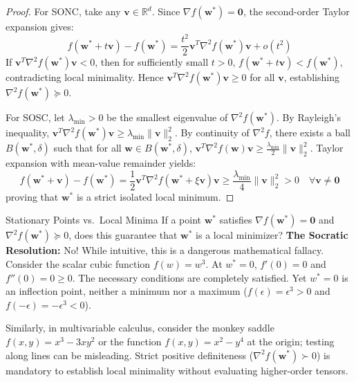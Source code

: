\begin{proof}
For SONC, take any $\mathbf{v} \in \mathbb{R}^d$. Since $\nabla f(\mathbf{w}^*) = \mathbf{0}$, the second-order Taylor expansion gives:
\begin{equation}
f(\mathbf{w}^* + t\mathbf{v}) - f(\mathbf{w}^*) = \frac{t^2}{2} \mathbf{v}^T \nabla^2 f(\mathbf{w}^*) \mathbf{v} + o(t^2)
\end{equation}
If $\mathbf{v}^T \nabla^2 f(\mathbf{w}^*) \mathbf{v} < 0$, then for sufficiently small $t > 0$, $f(\mathbf{w}^* + t\mathbf{v}) < f(\mathbf{w}^*)$, contradicting local minimality. Hence $\mathbf{v}^T \nabla^2 f(\mathbf{w}^*) \mathbf{v} \ge 0$ for all $\mathbf{v}$, establishing $\nabla^2 f(\mathbf{w}^*) \succeq 0$.

For SOSC, let $\lambda_{\min} > 0$ be the smallest eigenvalue of $\nabla^2 f(\mathbf{w}^*)$. By Rayleigh's inequality, $\mathbf{v}^T \nabla^2 f(\mathbf{w}^*) \mathbf{v} \ge \lambda_{\min} \|\mathbf{v}\|_2^2$. By continuity of $\nabla^2 f$, there exists a ball $B(\mathbf{w}^*, \delta)$ such that for all $\mathbf{w} \in B(\mathbf{w}^*, \delta)$, $\mathbf{v}^T \nabla^2 f(\mathbf{w}) \mathbf{v} \ge \frac{\lambda_{\min}}{2} \|\mathbf{v}\|_2^2$. Taylor expansion with mean-value remainder yields:
\begin{equation}
f(\mathbf{w}^* + \mathbf{v}) - f(\mathbf{w}^*) = \frac{1}{2}\mathbf{v}^T \nabla^2 f(\mathbf{w}^* + \xi \mathbf{v}) \mathbf{v} \ge \frac{\lambda_{\min}}{4} \|\mathbf{v}\|_2^2 > 0 \quad \forall \mathbf{v} \ne \mathbf{0}
\end{equation}
proving that $\mathbf{w}^*$ is a strict isolated local minimum.
\end{proof}

\begin{ponderbox}{Stationary Points vs.\ Local Minima}
If a point $\mathbf{w}^*$ satisfies $\nabla f(\mathbf{w}^*) = \mathbf{0}$ and $\nabla^2 f(\mathbf{w}^*) \succeq 0$, does this guarantee that $\mathbf{w}^*$ is a local minimizer?
\tcblower
\textbf{The Socratic Resolution:} No! While intuitive, this is a dangerous mathematical fallacy. Consider the scalar cubic function $f(w) = w^3$. At $w^* = 0$, $f'(0) = 0$ and $f''(0) = 0 \ge 0$. The necessary conditions are completely satisfied. Yet $w^* = 0$ is an inflection point, neither a minimum nor a maximum ($f(\epsilon) = \epsilon^3 > 0$ and $f(-\epsilon) = -\epsilon^3 < 0$). 

Similarly, in multivariable calculus, consider the monkey saddle $f(x, y) = x^3 - 3xy^2$ or the function $f(x, y) = x^2 - y^4$ at the origin; testing along lines can be misleading. Strict positive definiteness ($\nabla^2 f(\mathbf{w}^*) \succ 0$) is mandatory to establish local minimality without evaluating higher-order tensors.
\end{ponderbox}

